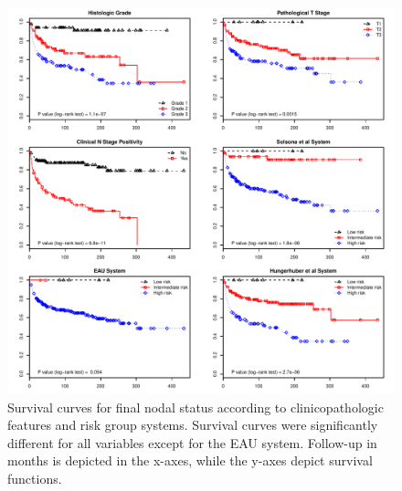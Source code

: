 \documentclass[11pt,letterpaper]{article}\usepackage[]{graphicx}\usepackage[]{color}
\makeatletter
\def\maxwidth{ %
  \ifdim\Gin@nat@width>\linewidth
    \linewidth
  \else
    \Gin@nat@width
  \fi
}
\newenvironment{knitrout}{}{} %
\makeatother
\begin{document}
\begin{multicols}{2}
\begin{figure}
\centering
\begin{knitrout}
\color{fgcolor}
\includegraphics[width=\maxwidth]{figure/Survival_FN-1} 

\end{knitrout}
        \caption{Survival curves for final nodal status according to clinicopathologic features and risk group systems. Survival curves were significantly different for all variables except for the EAU system. Follow-up in months is depicted in the x-axes, while the y-axes depict survival functions.}
        \label{fig:Survival_FN}
\end{figure}


\end{multicols}
\end{document}
